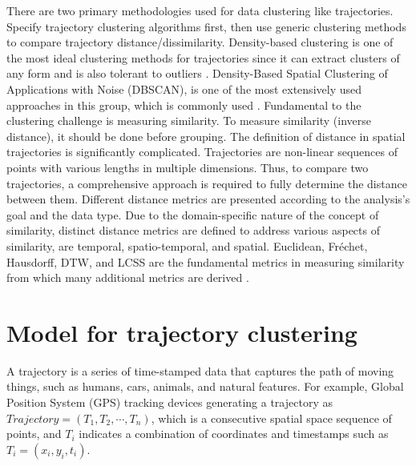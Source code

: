 \documentclass[a4paper, 12pt]{article}
\begin{document}
There are two primary methodologies used for data clustering like trajectories. Specify trajectory clustering algorithms first, then use generic clustering methods to compare trajectory distance/dissimilarity. Density-based clustering \citep{kriegel2011density} is one of the most ideal clustering methods for trajectories since it can extract clusters of any form and is also tolerant to outliers \citep{ester1996density}. Density-Based Spatial Clustering of Applications with Noise (DBSCAN), is one of the most extensively used approaches in this group, which is commonly used \citep{zhao2019trajectory, cheng2018density, chen2011clustering, lee2007trajectory}. Fundamental to the clustering challenge is measuring similarity. To measure similarity (inverse distance), it should be done before grouping. The definition of distance in spatial trajectories is significantly complicated. Trajectories are non-linear sequences of points with various lengths in multiple dimensions. Thus, to compare two trajectories, a comprehensive approach is required to fully determine the distance between them. Different distance metrics are presented according to the analysis's goal and the data type. Due to the domain-specific nature of the concept of similarity, distinct distance metrics are defined to address various aspects of similarity, are temporal, spatio-temporal, and spatial. Euclidean, Fréchet, Hausdorff, DTW, and LCSS are the fundamental metrics in measuring similarity from which many additional metrics are derived \citep{abbaspour2017method, aghabozorgi2015time, wang2013effectiveness}.

\section{Model for trajectory clustering}
A trajectory is a series of time-stamped data that captures the path of moving things, such as humans, cars, animals, and natural features. For example, Global Position System (GPS) tracking devices generating a trajectory as $Trajectory=(T_{1},T_{2},\cdots,T_{n})$, which is a consecutive spatial space sequence of points, and $T_{i}$ indicates a combination of coordinates and timestamps such as $T_i=(x_{i},y_{i},t_{i})$.
\end{document}
